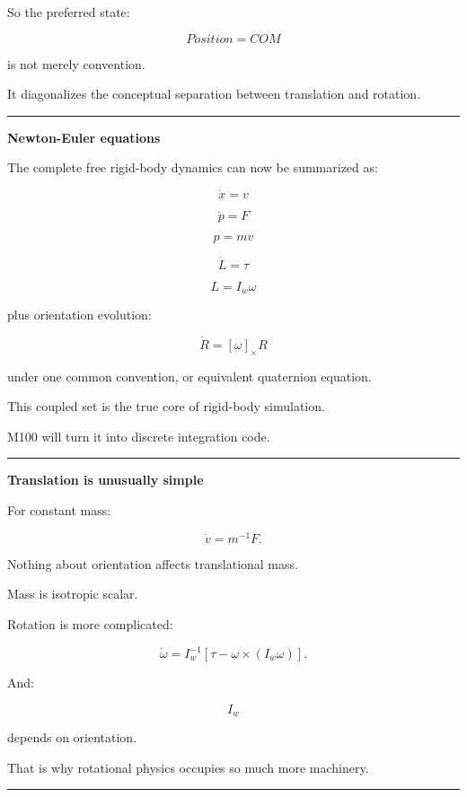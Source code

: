 So the preferred state:

\[
\boxed{
Position = COM
}
\]

is not merely convention.

It diagonalizes the conceptual separation between translation and rotation.

\begin{center}\rule{0.5\linewidth}{0.5pt}\end{center}

\textbf{Newton-Euler equations}

The complete free rigid-body dynamics can now be summarized as:

\[
\boxed{
\dot x=v
}
\]

\[
\boxed{
\dot p=F
}
\]

\[
\boxed{
p=mv
}
\]

\[
\boxed{
\dot L=\tau
}
\]

\[
\boxed{
L=I_w\omega
}
\]

plus orientation evolution:

\[
\dot R=[\omega]_\times R
\]

under one common convention, or equivalent quaternion equation.

This coupled set is the true core of rigid-body simulation.

M100 will turn it into discrete integration code.

\begin{center}\rule{0.5\linewidth}{0.5pt}\end{center}

\textbf{Translation is unusually simple}

For constant mass:

\[
\dot v=m^{-1}F.
\]

Nothing about orientation affects translational mass.

Mass is isotropic scalar.

Rotation is more complicated:

\[
\dot\omega
=
I_w^{-1}
[
\tau-\omega\times(I_w\omega)
].
\]

And:

\[
I_w
\]

depends on orientation.

That is why rotational physics occupies so much more machinery.

\begin{center}\rule{0.5\linewidth}{0.5pt}\end{center}

